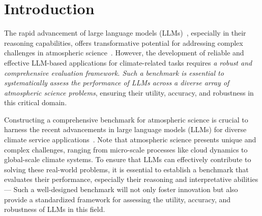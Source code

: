 \section{Introduction}



The rapid advancement of large language models (LLMs)~\cite{brown2020language}, especially in their reasoning capabilities, offers transformative potential for addressing complex challenges in atmospheric science~\cite{nguyen-etal-2024-climate, zhang2024opportunities, thulke2024climategpt, cao2024llmassisted}. However, the development of reliable and effective LLM-based applications for climate-related tasks requires \textit{a robust and comprehensive evaluation framework. Such a benchmark is essential to systematically assess the performance of LLMs across a diverse array of atmospheric science problems}, ensuring their utility, accuracy, and robustness in this critical domain.




Constructing a comprehensive benchmark for atmospheric science is crucial to harness the recent advancements in large language models (LLMs) for diverse climate service applications~\cite{zhang2024opportunities}. Note that atmospheric science presents unique and complex challenges, ranging from micro-scale processes like cloud dynamics to global-scale climate systems. To ensure that LLMs can effectively contribute to solving these real-world problems, it is essential to establish a benchmark that evaluates their performance, especially their reasoning and interpretative abilities --- Such a well-designed benchmark will not only foster innovation but also provide a standardized framework for assessing the utility, accuracy, and robustness of LLMs in this field.


